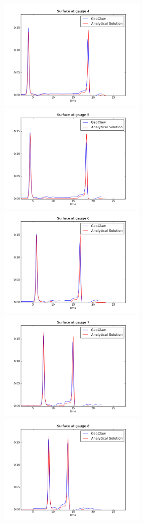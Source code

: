 \begin{figure}[ht]
\hfil\includegraphics[width=2.8in]{bp2/CaseC/gauge0004fig300.png}\hfil
\hfil\includegraphics[width=2.8in]{bp2/CaseC/gauge0005fig300.png}\hfil
\vskip 5pt
\hfil\includegraphics[width=2.8in]{bp2/CaseC/gauge0006fig300.png}\hfil
\hfil\includegraphics[width=2.8in]{bp2/CaseC/gauge0007fig300.png}\hfil
\vskip 5pt
\hfil\includegraphics[width=2.8in]{bp2/CaseC/gauge0008fig300.png}\hfil

\end{figure}
